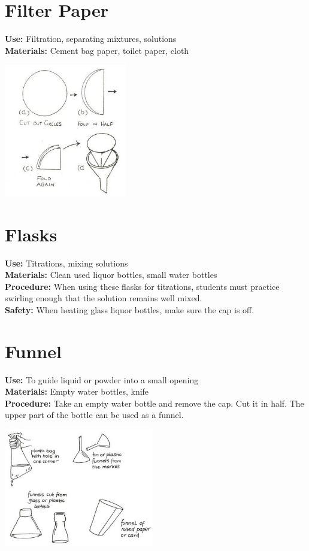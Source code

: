 \begin{multicols}{2}
\section{Filter Paper}
\label{sec:filter-paper}
\vspace{-10pt}
\textbf{Use:} Filtration, separating mixtures, solutions\\
\textbf{Materials:} Cement bag paper, toilet paper, cloth
\begin{center}
\includegraphics[width=0.4\textwidth]{./img/source/filter-paper.jpg}
\end{center}

\section{Flasks}
\label{sec:flasks}
\vspace{-10pt}
\textbf{Use:} Titrations, mixing solutions\\
\textbf{Materials:} Clean used liquor bottles, small water bottles\\
\textbf{Procedure:} When using these flasks for titrations, students must practice swirling enough that the solution remains well mixed. \\
\textbf{Safety:} When heating glass liquor bottles, make sure the cap is off.

\section{Funnel}
\label{sec:funnel}
\vspace{-10pt}
\textbf{Use:} To guide liquid or powder into a small opening\\
\textbf{Materials:} Empty water bottles, knife\\
\textbf{Procedure:} Take an empty water bottle and remove the cap. Cut it in half. The upper part of the bottle can be used as a funnel.  
\begin{center}
\includegraphics[width=0.49\textwidth]{./img/vso/funnels.jpg}
\end{center}


\end{multicols}
